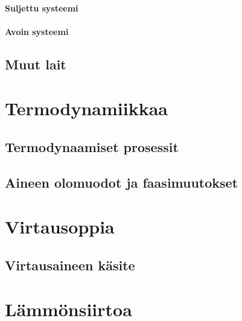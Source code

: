 \documentclass[12pt,a4paper,finnish]{book}
\begin{document}
\subsection{Suljettu systeemi}

\subsection{Avoin systeemi}

\chapter{Muut lait} %

\part{Termodynamiikkaa}%

\chapter{Termodynaamiset prosessit}

\chapter{Aineen olomuodot ja faasimuutokset}

\part{Virtausoppia} %

\chapter{Virtausaineen käsite}

\part{Lämmönsiirtoa} %
\end{document}
